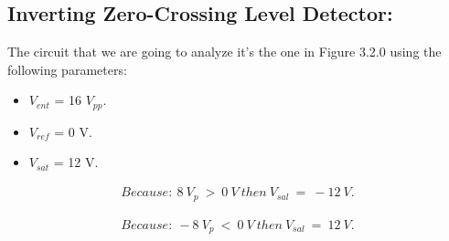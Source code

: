 \subsection{Inverting Zero-Crossing Level Detector:}

The circuit that we are going to analyze it's the one in Figure 3.2.0 using the following parameters: \hfill \break

{\bfseries
\begin{itemize}
\item $V_{ent}$ = 16 $V_{pp}$.
\item $V_{ref}$ = 0 V.
\item $V_{sat}$ = 12 V.
\end{itemize}} \hfill

{\bfseries\itshape{}} 

\begin{flushright}
{\bfseries\itshape{}} \hfill \break
\end{flushright}

\begin{ceqn}
\begin{align*}
Because:\ 8\ V_{p}\ >\ 0\ V\ then\ V_{sal}\ =\ -12\ V.
\end{align*}
\end{ceqn} \hfill \break

{\bfseries\itshape{}} 

\begin{flushright}
{\bfseries\itshape{}} \hfill \break
\end{flushright}

\begin{ceqn}
\begin{align*}
Because:\ -8\ V_{p}\ <\ 0\ V\ then\ V_{sal}\ =\ 12\ V.
\end{align*}
\end{ceqn} \hfill \break

{\bfseries\itshape{}} \hfill \break

\pagebreak